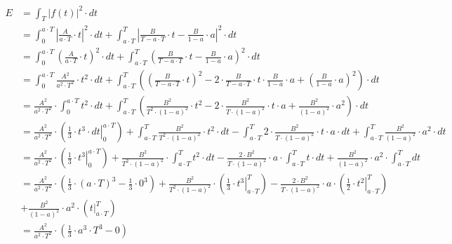\begin{align*}
E&=\int_{T}^{}\left|f(t)\right|^2 \cdot dt\\
 &=\int_{0}^{a \cdot T}\left|\frac{A}{a \cdot T}\cdot t \right|^2 \cdot dt
  +\int_{a \cdot T}^{T}\left|\frac{B}{T - a \cdot T}\cdot t - \frac{B}{1 - a} \cdot a\right|^2 \cdot dt\\ 
 &=\int_{0}^{a \cdot T}\left(\frac{A}{a \cdot T}\cdot t \right)^2 \cdot dt
  +\int_{a \cdot T}^{T}\left(\frac{B}{T - a \cdot T}\cdot t - \frac{B}{1 - a} \cdot a\right)^2 \cdot dt\\ 
 &=\int_{0}^{a \cdot T}\frac{A^2}{a^2 \cdot T^2}\cdot t^2 \cdot dt
 +\int_{a \cdot T}^{T}\left(\left(\frac{B}{T - a \cdot T}\cdot t\right)^2 - 2\cdot \frac{B}{T - a \cdot T}\cdot t \cdot  \frac{B}{1 - a} \cdot a + \left( \frac{B}{1 - a} \cdot a\right)^2 \right) \cdot dt\\ 
 &=\frac{A^2}{a^2 \cdot T^2}\cdot \int_{0}^{a \cdot T} t^2 \cdot dt
 +\int_{a \cdot T}^{T}\left(\frac{B^2}{T^2 \cdot \left(1 - a \right)^2}\cdot t^2 - 2\cdot \frac{B^2}{T\cdot \left(1 - a\right)^2}\cdot t \cdot a + \frac{B^2}{\left(1 - a \right)^2} \cdot a^2 \right) \cdot dt\\
 &=\frac{A^2}{a^2 \cdot T^2}\cdot \left(\left. \frac{1}{3}\cdot t^3 \cdot dt \right|_{0}^{a \cdot T} \right)
 +\int_{a \cdot T}^{T} \frac{B^2}{T^2 \cdot \left(1 - a \right)^2}\cdot t^2 \cdot dt - \int_{a \cdot T}^{T} 2\cdot \frac{B^2}{T\cdot \left(1 - a\right)^2}\cdot t \cdot a \cdot dt + \int_{a \cdot T}^{T} \frac{B^2}{\left(1 - a \right)^2} \cdot a^2 \cdot dt\\ 
 &=\frac{A^2}{a^2 \cdot T^2}\cdot \left(\left. \frac{1}{3}\cdot t^3 \right|_{0}^{a \cdot T} \right)
 +\frac{B^2}{T^2 \cdot \left(1 - a \right)^2}\cdot \int_{a \cdot T}^{T}  t^2 \cdot dt 
 - \frac{2\cdot B^2}{T\cdot \left(1 - a\right)^2}\cdot a \cdot \int_{a \cdot T}^{T} t \cdot dt 
 + \frac{B^2}{\left(1 - a \right)^2} \cdot a^2 \cdot \int_{a \cdot T}^{T} dt\\
 &=\frac{A^2}{a^2 \cdot T^2}\cdot \left(\frac{1}{3}\cdot \left(a \cdot T\right)^3 - \frac{1}{3}\cdot 0^3 \right)
 +\frac{B^2}{T^2 \cdot \left(1 - a \right)^2}\cdot \left( \left. \frac{1}{3} \cdot t^3 \right|_{a \cdot T}^{T} \right) 
 - \frac{2\cdot B^2}{T\cdot \left(1 - a\right)^2}\cdot a \cdot \left( \left. \frac{1}{2} \cdot t^2 \right|_{a \cdot T}^{T} \right) \\
 &+ \frac{B^2}{\left(1 - a \right)^2} \cdot a^2 \cdot \left( \left. t \right|_{a \cdot T}^{T} \right)\\
 &=\frac{A^2}{a^2 \cdot T^2}\cdot \left(\frac{1}{3}\cdot a^3 \cdot T^3 - 0 \right)

\end{align*}
